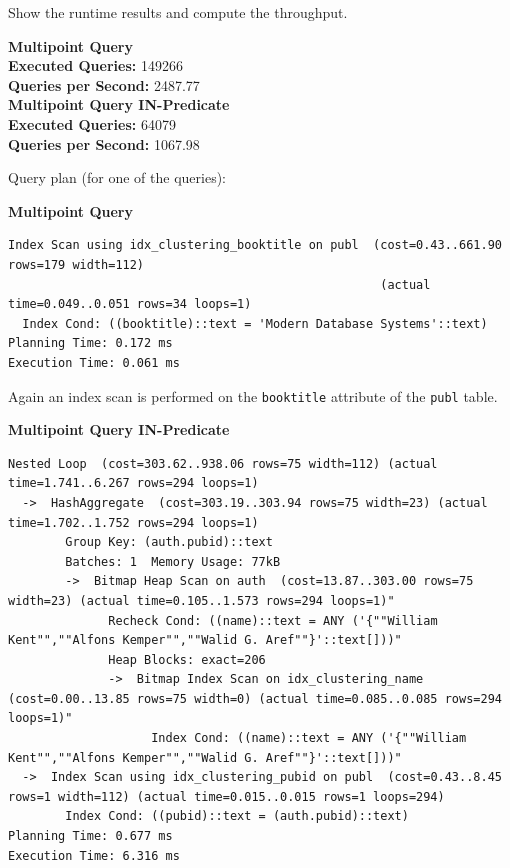 \documentclass[11pt]{scrartcl}
\begin{document}
Show the runtime results and compute the throughput.

\textbf{Multipoint Query}\\
\textbf{Executed Queries: } 149266\\
\textbf{Queries per Second: } 2487.77 \\

\textbf{Multipoint Query IN-Predicate}\\
\textbf{Executed Queries: } 64079\\
\textbf{Queries per Second: } 1067.98

Query plan (for one of the queries):

\textbf{Multipoint Query}
{\small
\parskip0pt\begin{verbatim}
Index Scan using idx_clustering_booktitle on publ  (cost=0.43..661.90 rows=179 width=112)
                                                    (actual time=0.049..0.051 rows=34 loops=1)
  Index Cond: ((booktitle)::text = 'Modern Database Systems'::text)
Planning Time: 0.172 ms
Execution Time: 0.061 ms

\end{verbatim}}

Again an index scan is performed on the \texttt{booktitle} attribute of the \texttt{publ} table.

\textbf{Multipoint Query IN-Predicate}
{\small
\parskip0pt\begin{verbatim}
Nested Loop  (cost=303.62..938.06 rows=75 width=112) (actual time=1.741..6.267 rows=294 loops=1)
  ->  HashAggregate  (cost=303.19..303.94 rows=75 width=23) (actual time=1.702..1.752 rows=294 loops=1)
        Group Key: (auth.pubid)::text
        Batches: 1  Memory Usage: 77kB
        ->  Bitmap Heap Scan on auth  (cost=13.87..303.00 rows=75 width=23) (actual time=0.105..1.573 rows=294 loops=1)"
              Recheck Cond: ((name)::text = ANY ('{""William Kent"",""Alfons Kemper"",""Walid G. Aref""}'::text[]))"
              Heap Blocks: exact=206
              ->  Bitmap Index Scan on idx_clustering_name  (cost=0.00..13.85 rows=75 width=0) (actual time=0.085..0.085 rows=294 loops=1)"
                    Index Cond: ((name)::text = ANY ('{""William Kent"",""Alfons Kemper"",""Walid G. Aref""}'::text[]))"
  ->  Index Scan using idx_clustering_pubid on publ  (cost=0.43..8.45 rows=1 width=112) (actual time=0.015..0.015 rows=1 loops=294)
        Index Cond: ((pubid)::text = (auth.pubid)::text)
Planning Time: 0.677 ms
Execution Time: 6.316 ms
\end{verbatim}}
\end{document}
